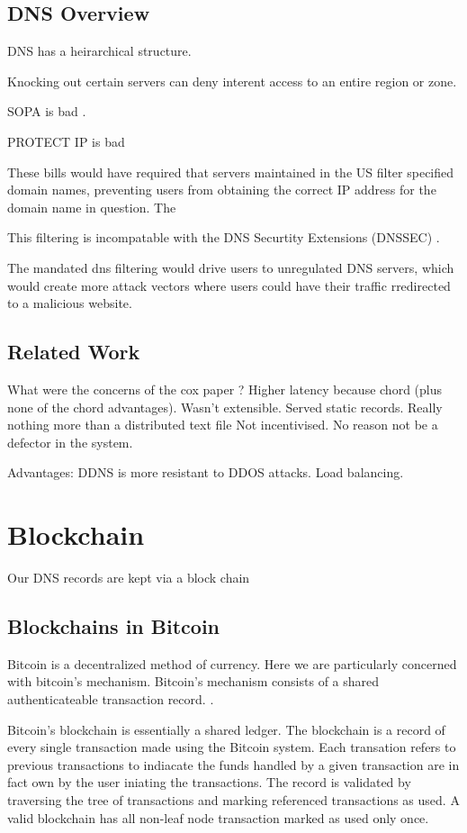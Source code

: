 \documentclass[11pt]{IEEEtran} %
\begin{document}
\subsection{DNS Overview}

DNS has a heirarchical structure.

Knocking out certain servers can deny interent access to an entire region or zone.

SOPA \cite{sopa} is bad \cite{lemley2011don}. 

PROTECT IP is bad \cite{crocker2011security}

These bills would have required that servers maintained in the US filter specified domain names, preventing users from obtaining the correct IP address for the domain name in question. The 

This filtering is incompatable with the DNS Securtity Extensions (DNSSEC) \cite{crocker2011security}. 

The mandated dns filtering would drive users to unregulated DNS servers, which would create more attack vectors where users could have their traffic rredirected to a malicious website. 

\subsection{Related Work}
What were the concerns of the cox paper \cite{cox}?  
Higher latency because chord (plus none of the chord advantages). 
Wasn't extensible.  Served static records.  Really nothing more than a distributed text file
Not incentivised. No reason not be a defector in the system.

Advantages:  DDNS is more resistant to DDOS attacks.  Load balancing.


\section{Blockchain}
Our DNS records are kept via a block chain

\subsection{Blockchains in Bitcoin}
Bitcoin is a decentralized method of currency. Here we are particularly concerned with bitcoin's mechanism. Bitcoin's mechanism consists of a shared authenticateable transaction record.  \cite{bitcoin} \cite{namecoin}.

Bitcoin's blockchain is essentially a shared ledger.  The blockchain is a record of every single transaction made using the Bitcoin system. Each transation refers to previous transactions to indiacate the funds handled by a given transaction are in fact own by the user iniating the transactions. The record is validated by traversing the tree of transactions and marking referenced transactions as used. A valid blockchain has all non-leaf node transaction marked as used only once.
\end{document}
